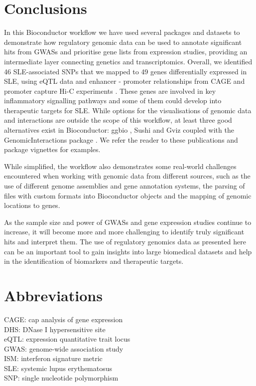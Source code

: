\documentclass[9pt,a4paper,]{extarticle}
\theoremstyle{definition}
\theoremstyle{definition}
\theoremstyle{definition}
\theoremstyle{remark}
\begin{document}
\section{Conclusions}\label{conclusions}

In this Bioconductor workflow we have used several packages and datasets to demonstrate how regulatory genomic data can be used to annotate significant hits from GWASs and prioritise gene lists from expression studies, providing an intermediate layer connecting genetics and transcriptomics.
Overall, we identified 46 SLE-associated SNPs that we mapped to 49 genes differentially expressed in SLE, using eQTL data \citep{GTEx2017} and enhancer - promoter relationships from CAGE \citep{Fantom2014} and promoter capture Hi-C experiments \citep{Javierre2016}.
These genes are involved in key inflammatory signalling pathways and some of them could develop into therapeutic targets for SLE.
While options for the visualisations of genomic data and interactions are outside the scope of this workflow, at least three good alternatives exist in Bioconductor: ggbio \citep{Yin2012}, Sushi \citep{Phanstiel2014} and Gviz \citep{Hahne2016} coupled with the GenomicInteractions package \citep{Harmston2015}.
We refer the reader to these publications and package vignettes for examples.

While simplified, the workflow also demonstrates some real-world challenges encountered when working with genomic data from different sources, such as the use of different genome assemblies and gene annotation systems, the parsing of files with custom formats into Bioconductor objects and the mapping of genomic locations to genes.

As the sample size and power of GWASs and gene expression studies continue to increase, it will become more and more challenging to identify truly significant hits and interpret them.
The use of regulatory genomics data as presented here can be an important tool to gain insights into large biomedical datasets and help in the identification of biomarkers and therapeutic targets.

\section{Abbreviations}\label{abbreviations}

CAGE: cap analysis of gene expression\\
DHS: DNase I hypersensitive site\\
eQTL: expression quantitative trait locus\\
GWAS: genome-wide association study\\
ISM: interferon signature metric\\
SLE: systemic lupus erythematosus\\
SNP: single nucleotide polymorphism
\end{document}
